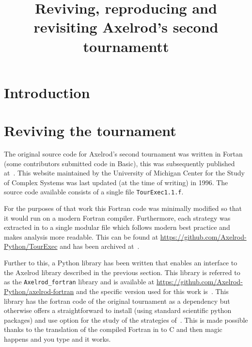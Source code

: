 \documentclass{article}
\title{Reviving, reproducing and revisiting Axelrod's second tournamentt}
\begin{document}
\maketitle

\section{Introduction}\label{sec:introduction}



\section{Reviving the tournament}\label{sec:reviving}

The original source code for Axelrod's second tournament was written in Fortan
(some contributors submitted code in Basic), this was subsequently published
at~\cite{Axelrod1980bCode}. This website maintained by the University of Michigan
Center for the Study of Complex Systems was last updated (at the time of
writing) in 1996. The source code available consists of a single file
\texttt{TourExec1.1.f}.

For the purposes of that work this Fortran code was minimally modified so that
it would run on a modern Fortran compiler.
Furthermore, each strategy was extracted in to a single modular file which
follows modern best practice and makes analysis more readable. This can be found
at \url{https://github.com/Axelrod-Python/TourExec} and has been archived
at~\cite{TourExec}.

Further to this, a Python library has been written that enables an interface to
the Axelrod library described in the previous section. This library is referred
to as the \texttt{Axelrod\_fortran} library and is available
at \url{https://github.com/Axelrod-Python/axelrod-fortran} and the specific
version used for this work is~\cite{Axelrod_fortran}.
This library has the fortran code of the original tournament as a dependency but
otherwise offers a straightforward to install (using standard scientific python
packages) and use option for the study of
the strategies of~\cite{Axelrod1980b}.
This is made possible thanks to the translation of the compiled Fortran in to C
and then magic happens and you type and it works.
\end{document}
